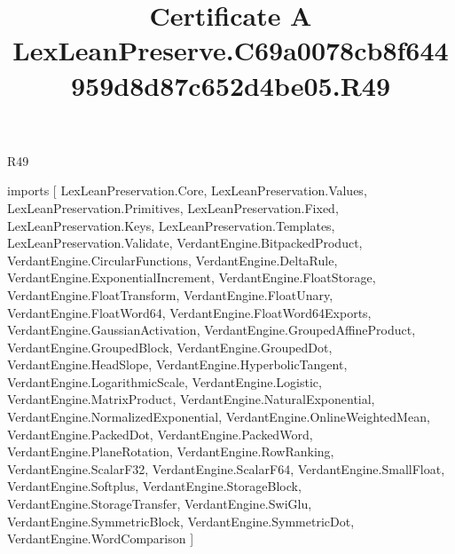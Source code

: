 \begin{lexlean}{R49}
\title{Certificate A LexLeanPreserve.C69a0078cb8f644959d8d87c652d4be05.R49}
\begin{coremodule}
imports [
  LexLeanPreservation.Core,
  LexLeanPreservation.Values,
  LexLeanPreservation.Primitives,
  LexLeanPreservation.Fixed,
  LexLeanPreservation.Keys,
  LexLeanPreservation.Templates,
  LexLeanPreservation.Validate,
  VerdantEngine.BitpackedProduct,
  VerdantEngine.CircularFunctions,
  VerdantEngine.DeltaRule,
  VerdantEngine.ExponentialIncrement,
  VerdantEngine.FloatStorage,
  VerdantEngine.FloatTransform,
  VerdantEngine.FloatUnary,
  VerdantEngine.FloatWord64,
  VerdantEngine.FloatWord64Exports,
  VerdantEngine.GaussianActivation,
  VerdantEngine.GroupedAffineProduct,
  VerdantEngine.GroupedBlock,
  VerdantEngine.GroupedDot,
  VerdantEngine.HeadSlope,
  VerdantEngine.HyperbolicTangent,
  VerdantEngine.LogarithmicScale,
  VerdantEngine.Logistic,
  VerdantEngine.MatrixProduct,
  VerdantEngine.NaturalExponential,
  VerdantEngine.NormalizedExponential,
  VerdantEngine.OnlineWeightedMean,
  VerdantEngine.PackedDot,
  VerdantEngine.PackedWord,
  VerdantEngine.PlaneRotation,
  VerdantEngine.RowRanking,
  VerdantEngine.ScalarF32,
  VerdantEngine.ScalarF64,
  VerdantEngine.SmallFloat,
  VerdantEngine.Softplus,
  VerdantEngine.StorageBlock,
  VerdantEngine.StorageTransfer,
  VerdantEngine.SwiGlu,
  VerdantEngine.SymmetricBlock,
  VerdantEngine.SymmetricDot,
  VerdantEngine.WordComparison
]


\end{coremodule}
\end{lexlean}
